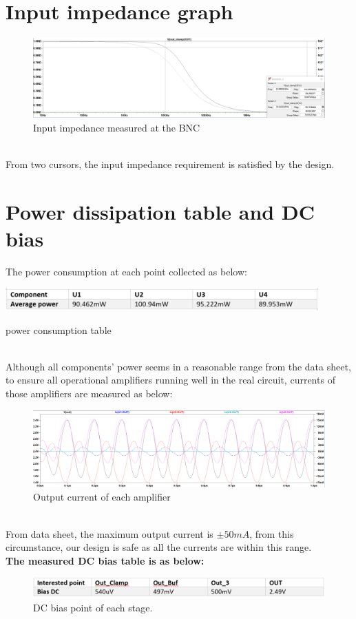 \documentclass[pdftex,12pt,a4paper]{article}
\begin{document}
\section{Input impedance graph}
\begin{figure}[H]
\centering
\includegraphics[width=14cm]{imp.png}
\caption{Input impedance measured at the BNC}
\end{figure}
~\\ From two cursors, the input impedance requirement is satisfied by the design. 
\section{Power dissipation table and DC bias}
The power consumption at each point collected as below:
\begin{table}[H]
\centering
\includegraphics[width=12cm]{tab.png}
\caption{power consumption table}
\end{table} 
~\\Although all components' power seems in a reasonable range from the data sheet, to ensure all operational amplifiers running  well in the real circuit, currents of those amplifiers are measured as below: 
\begin{figure}[H]
\centering
\includegraphics[width=16cm]{oplim.png}
\caption{Output current of each amplifier}
\end{figure}
~\\From data sheet, the maximum output current is $\pm 50mA$, from this circumstance, our design is safe as all the currents are within this range. \\
\textbf{The measured DC bias table is as below:} 
\begin{figure}[H]
\centering
\includegraphics[width=16cm]{biasDC.png}
\caption{DC bias point of each stage.}
\end{figure}  
\end{document}

